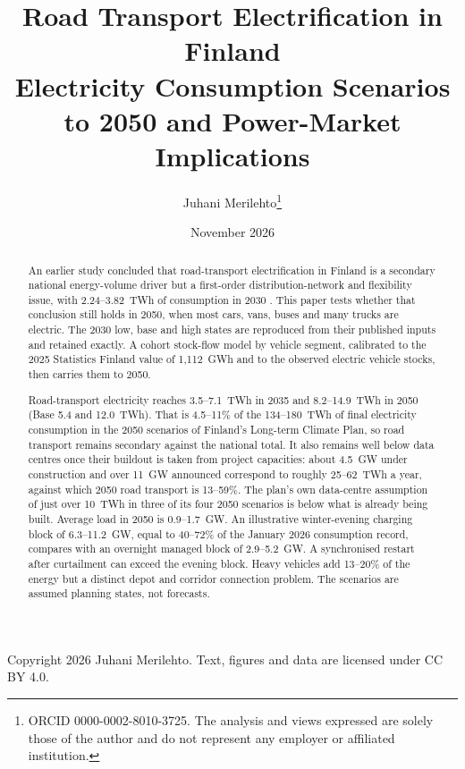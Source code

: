\documentclass[11pt,a4paper]{article}
\title{\textbf{Road Transport Electrification in Finland}\\[4pt]
\large Electricity Consumption Scenarios to 2050 and Power-Market Implications}
\author{Juhani Merilehto\thanks{ORCID 0000-0002-8010-3725. The analysis and views expressed are solely those of the author and do not represent any employer or affiliated institution.}}
\date{November 2026}
\begin{document}
\maketitle
\vspace{-1.2em}
\begin{center}\small\color{ink2}Copyright \textcopyright{} 2026 Juhani Merilehto. Text, figures and data are licensed under CC BY 4.0.\end{center}

\begin{abstract}
\noindent An earlier study concluded that road-transport electrification in Finland is a secondary national energy-volume driver but a first-order distribution-network and flexibility issue, with 2.24--3.82~TWh of consumption in 2030 \citep{merilehto2026road2030}. This paper tests whether that conclusion still holds in 2050, when most cars, vans, buses and many trucks are electric. The 2030 low, base and high states are reproduced from their published inputs and retained exactly. A cohort stock-flow model by vehicle segment, calibrated to the 2025 Statistics Finland value of 1,112~GWh and to the observed electric vehicle stocks, then carries them to 2050.

Road-transport electricity reaches 3.5--7.1~TWh in 2035 and 8.2--14.9~TWh in 2050 (Base 5.4 and 12.0~TWh). That is 4.5--11\% of the 134--180~TWh of final electricity consumption in the 2050 scenarios of Finland's Long-term Climate Plan, so road transport remains secondary against the national total. It also remains well below data centres once their buildout is taken from project capacities: about 4.5~GW under construction and over 11~GW announced correspond to roughly 25--62~TWh a year, against which 2050 road transport is 13--59\%. The plan's own data-centre assumption of just over 10~TWh in three of its four 2050 scenarios is below what is already being built. Average load in 2050 is 0.9--1.7~GW. An illustrative winter-evening charging block of 6.3--11.2~GW, equal to 40--72\% of the January 2026 consumption record, compares with an overnight managed block of 2.9--5.2~GW. A synchronised restart after curtailment can exceed the evening block. Heavy vehicles add 13--20\% of the energy but a distinct depot and corridor connection problem. The scenarios are assumed planning states, not forecasts.
\end{abstract}
\end{document}
